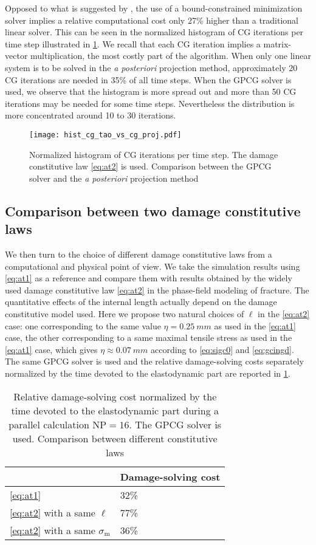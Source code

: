 Opposed to what is suggested by \cite{AmorMarigoMaurini:2009}, the use of a bound-constrained minimization solver implies a relative computational cost only 27\% higher than a traditional linear solver. This can be seen in the normalized histogram of CG iterations per time step illustrated in \cref{fig:histcg}. We recall that each CG iteration implies a matrix-vector multiplication, the most costly part of the algorithm. When only one linear system is to be solved in the \emph{a posteriori} projection method, approximately 20 CG iterations are needed in 35\% of all time steps. When the GPCG solver is used, we observe that the histogram is more spread out and more than 50 CG iterations may be needed for some time steps. Nevertheless the distribution is more concentrated around 10 to 30 iterations.
\begin{figure}[htbp]
\centering
\texttt{[image: hist\_cg\_tao\_vs\_cg\_proj.pdf]}
\caption{Normalized histogram of CG iterations per time step. The damage constitutive law \eqref{eq:at2} is used. Comparison between the GPCG solver and the \emph{a posteriori} projection method} \label{fig:histcg}
\end{figure}

\subsection{Comparison between two damage constitutive laws}
We then turn to the choice of different damage constitutive laws from a computational and physical point of view. We take the simulation results using \eqref{eq:at1} as a reference and compare them with results obtained by the widely used damage constitutive law \eqref{eq:at2} in the phase-field modeling of fracture. The quantitative effects of the internal length actually depend on the damage constitutive model used. Here we propose two natural choices of $\ell$ in the \eqref{eq:at2} case: one corresponding to the same value $\eta=\SI{0.25}{mm}$ as used in the \eqref{eq:at1} case, the other corresponding to a same maximal tensile stress as used in the \eqref{eq:at1} case, which gives $\eta\approx\SI{0.07}{mm}$ according to \eqref{eq:sigc0} and \eqref{eq:gcingd}. The same GPCG solver is used and the relative damage-solving costs separately normalized by the time devoted to the elastodynamic part are reported in \cref{tab:at1_vs_at2}.
\begin{table}[htbp]
\centering
\caption{Relative damage-solving cost normalized by the time devoted to the elastodynamic part during a parallel calculation $\mathrm{NP}=16$. The GPCG solver is used. Comparison between different constitutive laws} \label{tab:at1_vs_at2}
\begin{tabular}{ll} \toprule
& Damage-solving cost  \\ \midrule
\eqref{eq:at1} & 32\% \\
\eqref{eq:at2} with a same $\ell$ & 77\% \\
\eqref{eq:at2} with a same $\sigma_\mathrm{m}$ & 36\% \\ \bottomrule
\end{tabular}
\end{table}

